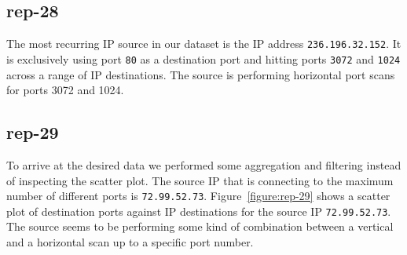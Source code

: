 \documentclass{article}
\begin{document}
\subsection{rep-28}

The most recurring IP source in our dataset is the IP address \texttt{236.196.32.152}.
It is exclusively using port \texttt{80} as a destination port and hitting ports \texttt{3072}
and \texttt{1024} across a range of IP destinations. The source is performing horizontal port scans
for ports 3072 and 1024.

\subsection{rep-29}

To arrive at the desired data we performed some aggregation and filtering instead of
inspecting the scatter plot. The source IP that is connecting to the maximum number of
different ports is \texttt{72.99.52.73}.
Figure~\ref{figure:rep-29} shows a scatter plot of destination ports against IP destinations
for the source IP \texttt{72.99.52.73}. The source seems to be performing some kind of combination
between a vertical and a horizontal scan up to a specific port number.
\end{document}
